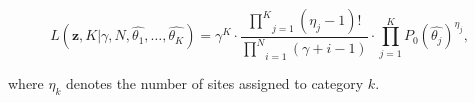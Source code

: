 \begin{equation}
L(\mathbf{z},K|\gamma,N,\hat{\theta_{1}},\ldots,\hat{\theta_{K}})=\gamma^{K}\cdot\frac{\underset{j=1}{\overset{K}{\prod}}\left(\eta_{j}-1\right)!}{\underset{i=1}{\overset{N}{\prod}}\left(\gamma+i-1\right)}\cdot\underset{j=1}{\overset{K}{\prod}}P_{0}\left(\hat{\theta_{j}}\right)^{\eta_{j}},
\label{eq:dppLike} 
\end{equation} 

\noindent 
where $\eta_{k}$ denotes the number of sites assigned to category $k$.








